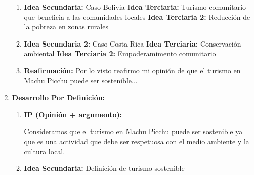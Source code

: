 \documentclass{article}
\begin{document}
\begin{center}
\begin{enumerate}
\begin{enumerate}
      \item \textbf{Idea Secundaria:} Caso Bolivia
      \subitem \textbf{Idea Terciaria:} Turismo comunitario que beneficia a las comunidades locales
      \subitem \textbf{Idea Terciaria 2:} Reducción de la pobreza en zonas rurales
      \item \textbf{Idea Secundaria 2:} Caso Costa Rica
      \subitem \textbf{Idea Terciaria:} Conservación ambiental
      \subitem \textbf{Idea Terciaria 2:} Empoderamimento comunitario
      \item \textbf{Reafirmación:} Por lo visto reafirmo mi opinión de que el turismo en Machu Picchu puede ser sostenible...
    \end{enumerate}
    \item \textbf{Desarrollo Por Definición:}
    \begin{enumerate}
      \item \textbf{IP (Opinión + argumento):} 
      
      Consideramos que el turismo en Machu Picchu puede ser sostenible ya que es una actividad que debe ser respetuosa con el medio ambiente y la cultura local. 

\item \textbf{Idea Secundaria:} Definición de turismo sostenible


\end{enumerate}
\end{enumerate}
\end{center}
\end{document}
